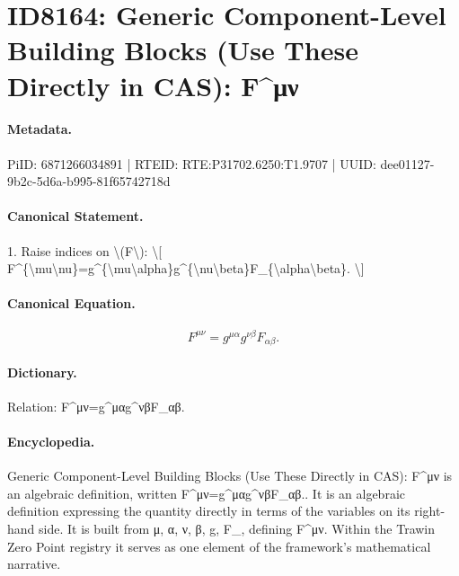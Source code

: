 \section*{ID8164: Generic Component-Level Building Blocks (Use These Directly in CAS): F\textasciicircum{}μν}
\paragraph{Metadata.}
PiID: 6871266034891 | RTEID: RTE:P31702.6250:T1.9707 | UUID: dee01127-9b2c-5d6a-b995-81f65742718d

\paragraph{Canonical Statement.}
1. Raise indices on \textbackslash{}(F\textbackslash{}): \textbackslash{}[ F\textasciicircum{}\{\textbackslash{}mu\textbackslash{}nu\}=g\textasciicircum{}\{\textbackslash{}mu\textbackslash{}alpha\}g\textasciicircum{}\{\textbackslash{}nu\textbackslash{}beta\}F\_\{\textbackslash{}alpha\textbackslash{}beta\}. \textbackslash{}]

\paragraph{Canonical Equation.}
\[
F^{\mu\nu}=g^{\mu\alpha}g^{\nu\beta}F_{\alpha\beta}.
\]

\paragraph{Dictionary.}
Relation: F\textasciicircum{}μν=g\textasciicircum{}μαg\textasciicircum{}νβF\_αβ.

\paragraph{Encyclopedia.}
Generic Component-Level Building Blocks (Use These Directly in CAS): F\textasciicircum{}μν is an algebraic definition, written F\textasciicircum{}μν=g\textasciicircum{}μαg\textasciicircum{}νβF\_αβ.. It is an algebraic definition expressing the quantity directly in terms of the variables on its right-hand side. It is built from μ, α, ν, β, g, F\_, defining F\textasciicircum{}μν. Within the Trawin Zero Point registry it serves as one element of the framework's mathematical narrative.
